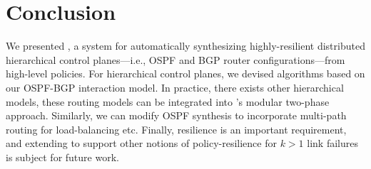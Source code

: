 \section{Conclusion}
We presented \name, a system for automatically synthesizing 
highly-resilient distributed hierarchical control planes---i.e., OSPF and 
BGP router configurations---from
high-level policies. For hierarchical control planes, 
we devised algorithms based on our OSPF-BGP interaction model. In 
practice, there exists other hierarchical models, these routing
models can be integrated into \name's modular two-phase approach.
Similarly, we can modify OSPF synthesis to incorporate multi-path routing
for load-balancing etc. Finally, resilience is an important requirement, 
and extending \name to support other notions of policy-resilience
for $k > 1$ link failures is subject for future work.